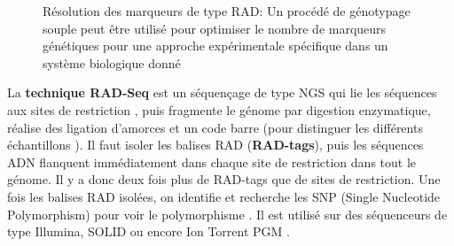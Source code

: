 \documentclass[a4paper,11pt,twoside]{report}
\begin{document}
\begin{figure}[!ht]
\caption{Résolution des marqueurs de type RAD: Un procédé de génotypage souple peut être utilisé pour optimiser le nombre de marqueurs génétiques pour une approche expérimentale spécifique dans un système biologique donné\citep{peterson2012double}}
\end{figure}

La \textbf{technique RAD-Seq} est un séquençage de type NGS qui lie les séquences aux sites de restriction \citep{Baird2008aa}, puis fragmente le génome par digestion enzymatique, réalise des ligation d'amorces et un code barre (pour distinguer les différents échantillons \citep{davey2013special}). Il faut isoler les balises RAD (\textbf{RAD-tags}), puis les séquences ADN flanquent immédiatement dans chaque site de restriction dans tout le génome. Il y a donc deux fois plus de RAD-tags que de sites de restriction\citep{davey2013special}. Une fois les balises RAD isolées, on identifie et recherche les SNP (Single Nucleotide Polymorphism) pour voir le polymorphisme \citep{hohenlohe2010population}. Il est utilisé sur des séquenceurs de type Illumina, SOLID ou encore Ion Torrent PGM \citep{hohenlohe2010population}. 
\end{document}
